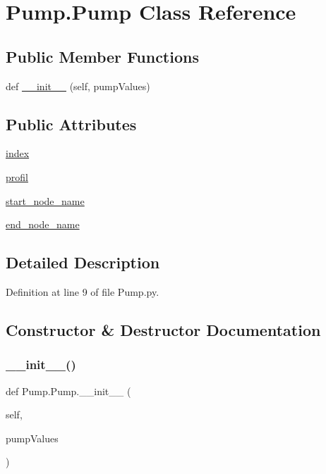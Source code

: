 \hypertarget{class_pump_1_1_pump}{}\section{Pump.\+Pump Class Reference}
\label{class_pump_1_1_pump}
\subsection*{Public Member Functions}
\begin{DoxyCompactItemize}
\item 
def \hyperlink{class_pump_1_1_pump_ad14459de937821f1a7da00d1bc441736}{\+\_\+\+\_\+init\+\_\+\+\_\+} (self, pump\+Values)
\end{DoxyCompactItemize}
\subsection*{Public Attributes}
\begin{DoxyCompactItemize}
\item 
\hyperlink{class_pump_1_1_pump_a4949cef4c42e9e9c5d4aafeabfba6713}{index}
\item 
\hyperlink{class_pump_1_1_pump_accd80242e8b18e06dd204bd713faa6eb}{profil}
\item 
\hyperlink{class_pump_1_1_pump_af8930a9eacd9a2dc69ee882b522c835d}{start\+\_\+node\+\_\+name}
\item 
\hyperlink{class_pump_1_1_pump_a42e1787eafa24a302374f18027810c42}{end\+\_\+node\+\_\+name}
\end{DoxyCompactItemize}


\subsection{Detailed Description}


Definition at line 9 of file Pump.\+py.



\subsection{Constructor \& Destructor Documentation}
\mbox{\label{class_pump_1_1_pump_ad14459de937821f1a7da00d1bc441736}} 
\subsubsection{\texorpdfstring{\+\_\+\+\_\+init\+\_\+\+\_\+()}{\_\_init\_\_()}}
{\footnotesize\ttfamily def Pump.\+Pump.\+\_\+\+\_\+init\+\_\+\+\_\+ (\begin{DoxyParamCaption}\item[{}]{self,  }\item[{}]{pump\+Values }\end{DoxyParamCaption})}



